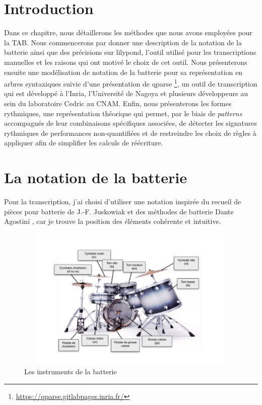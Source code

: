 \section*{Introduction}
Dans ce chapitre, nous détaillerons les méthodes que nous avons employées pour
la TAB. Nous commencerons par donner une description de la notation de la
batterie ainsi que des précisions sur lilypond, l’outil utilisé pour les
transcriptions manuelles et les raisons qui ont motivé le choix de cet outil.
Nous présenterons ensuite une modélisation de notation de la batterie pour sa
représentation en arbres syntaxiques suivie d’une présentation de qparse
\footnote{\url{https://qparse.gitlabpages.inria.fr/}}, un outil de transcription qui
est développé à l’Inria, l’Université de Nagoya et plusieurs développeurs au
sein du laboratoire Cedric au CNAM. Enfin, nous présenterons les
formes rythmiques, une représentation théorique qui
permet, par le biais de \textit{patterns} accompagnés de leur combinaisons
spécifiques associées, de détecter les signatures rythmiques de performances
non-quantifiées et de restreindre les choix de règles à appliquer afin de 
simplifier les calculs de réécriture.

\section{La notation de la batterie}
\label{notation_batterie}
Pour la transcription, j’ai choisi d’utiliser une notation inspirée du recueil
de pièces pour batterie de J.-F. Juskowiak \cite{jusko} et des méthodes de
batterie Dante Agostini \cite{ago_meth_3}, car je trouve la position des éléments
cohérente et intuitive.

\begin{figure}[h]
\centering
\includegraphics[height=69mm, width=115mm]{
z_images/3_methodes/0_notation_de_la_batterie/batterie.png}
\caption{Les instruments de la batterie}
\label{instru_batt}
\end{figure}

